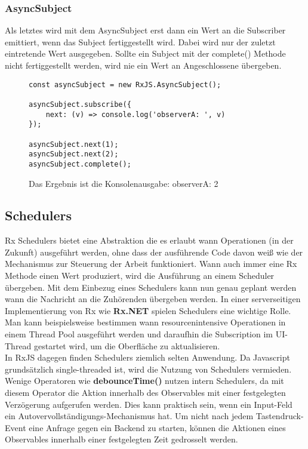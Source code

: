 \subsubsection{AsyncSubject}
Als letztes wird mit dem AsyncSubject erst dann ein Wert an die Subscriber emittiert, wenn das Subject fertiggestellt wird. Dabei wird nur der zuletzt eintretende Wert ausgegeben. Sollte ein Subject mit der complete() Methode nicht fertiggestellt werden, wird nie ein Wert an Angeschlossene übergeben.

\begin{figure}[H]
\begin{lstlisting}[basicstyle=\small]
const asyncSubject = new RxJS.AsyncSubject();

asyncSubject.subscribe({
    next: (v) => console.log('observerA: ', v)
});

asyncSubject.next(1);
asyncSubject.next(2);
asyncSubject.complete();
\end{lstlisting}
\caption{Das Ergebnis ist die Konsolenausgabe: \glqq observerA:  2 \grqq{}}
\end{figure}

\subsection{Schedulers}

Rx Schedulers bietet eine Abstraktion die es erlaubt wann Operationen (in der Zukunft) ausgeführt werden, ohne dass der ausführende Code davon weiß wie der Mechanismus zur Steuerung der Arbeit funktioniert. Wann auch immer eine Rx Methode einen Wert produziert, wird die Ausführung an einem Scheduler übergeben. Mit dem Einbezug eines Schedulers kann nun genau geplant werden wann die Nachricht an die Zuhörenden übergeben werden. In einer serverseitigen Implementierung von Rx wie \textbf{Rx.NET} spielen Schedulers eine wichtige Rolle. Man kann beispielsweise bestimmen wann resourcenintensive Operationen in einem Thread Pool ausgeführt werden und daraufhin die Subscription im UI-Thread gestartet wird, um die Oberfläche zu aktualisieren\cite{rx-schedulers}.\\

\noindent
In RxJS dagegen finden Schedulers ziemlich selten Anwendung. Da Javascript grundsätzlich single-threaded ist, wird die Nutzung von Schedulers vermieden. Wenige Operatoren wie \textbf{debounceTime()} nutzen intern Schedulers, da mit diesem Operator die Aktion innerhalb des Observables mit einer festgelegten Verzögerung aufgerufen werden. Dies kann praktisch sein, wenn ein Input-Feld ein Autovervollständigungs-Mechanismus hat. Um nicht nach jedem Tastendruck-Event eine Anfrage gegen ein Backend zu starten, können die Aktionen eines Observables innerhalb einer festgelegten Zeit gedrosselt werden.\\

